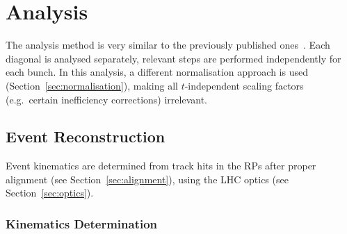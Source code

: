 \section{Analysis}

The analysis method is very similar to the previously published 
ones~\cite{epl101-el,prl111}. Each diagonal is analysed
separately, relevant steps are performed independently for each bunch. In this 
analysis, a different normalisation
approach is used (Section~\ref{sec:normalisation}), making all 
$t$-independent scaling factors (e.g.~certain inefficiency corrections)
irrelevant.




\subsection{Event Reconstruction}

Event kinematics are determined from track hits in the RPs after proper 
alignment (see Section~\ref{sec:alignment}), using the LHC optics 
(see Section~\ref{sec:optics}).


\subsubsection{Kinematics Determination}
\label{sec:kinematics}

